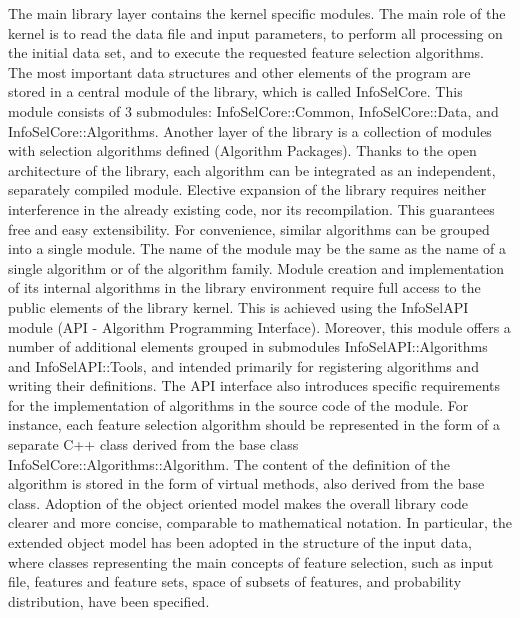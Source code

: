 \documentclass[a4paper,fleqn]{report}
\begin{document}
The main library layer contains the kernel specific modules. The main role of the kernel is to read the data file and input parameters, 
to perform all processing on the initial data set, and to execute the requested feature selection algorithms. 
The most important data structures and other elements of the program are stored in a central module of the library, which is called 
InfoSelCore.  This module consists of 3 submodules: InfoSelCore::Common, InfoSelCore::Data, and InfoSelCore::Algorithms.
Another layer of the library is a collection of modules with selection algorithms defined (Algorithm Packages). 
Thanks to the open architecture of the library, each algorithm can be integrated as an independent, separately compiled module. 
Elective expansion of the library requires neither interference in the already existing code, nor its recompilation. 
This guarantees free and easy extensibility. For convenience, similar algorithms can be grouped into a single module. 
The name of the module may be the same as the name of a single algorithm or of the algorithm family. 
Module creation and implementation of its internal algorithms in the library environment require full access to the 
public elements of the library kernel. This is achieved using the InfoSelAPI module (API - Algorithm Programming Interface). 
Moreover, this module offers a number of additional elements grouped in submodules InfoSelAPI::Algorithms and InfoSelAPI::Tools, 
and intended
primarily for registering algorithms and writing their definitions. The API interface also introduces specific requirements for the implementation of algorithms in the source code of the module. For instance, each feature selection algorithm should
be represented in the form of a separate C++ class derived from the base class InfoSelCore::Algorithms::Algorithm. The content of the definition of the algorithm 
is stored in the form of virtual methods, also derived from the base class. 
Adoption of the object oriented model makes the overall library code clearer and more concise, comparable to mathematical notation. In particular, the extended object model has been adopted in the structure of the input data, where classes 
representing the main concepts of feature selection, such as input file, features and feature sets, space of subsets of features, 
and probability distribution, have been specified.
\end{document}
